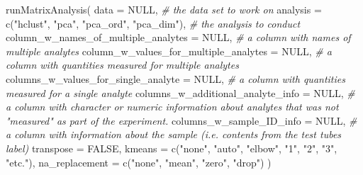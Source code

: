 \documentclass[
]{krantz}
\newenvironment{Shaded}{\begin{snugshade}}{\end{snugshade}}
\newcommand{\AttributeTok}[1]{\textcolor[rgb]{0.77,0.63,0.00}{#1}}
\newcommand{\CommentTok}[1]{\textcolor[rgb]{0.56,0.35,0.01}{\textit{#1}}}
\newcommand{\ConstantTok}[1]{\textcolor[rgb]{0.00,0.00,0.00}{#1}}
\newcommand{\FunctionTok}[1]{\textcolor[rgb]{0.00,0.00,0.00}{#1}}
\newcommand{\NormalTok}[1]{#1}
\newcommand{\StringTok}[1]{\textcolor[rgb]{0.31,0.60,0.02}{#1}}
\begin{document}
\begin{Shaded}
\begin{Highlighting}[]

\FunctionTok{runMatrixAnalysis}\NormalTok{(}
  \AttributeTok{data =} \ConstantTok{NULL}\NormalTok{, }\CommentTok{\# the data set to work on}
  \AttributeTok{analysis =} \FunctionTok{c}\NormalTok{(}\StringTok{"hclust"}\NormalTok{, }\StringTok{"pca"}\NormalTok{, }\StringTok{"pca\_ord"}\NormalTok{, }\StringTok{"pca\_dim"}\NormalTok{), }\CommentTok{\# the analysis to conduct}
  \AttributeTok{column\_w\_names\_of\_multiple\_analytes =} \ConstantTok{NULL}\NormalTok{, }\CommentTok{\# a column with names of multiple analytes}
  \AttributeTok{column\_w\_values\_for\_multiple\_analytes =} \ConstantTok{NULL}\NormalTok{, }\CommentTok{\# a column with quantities measured for multiple analytes}
  \AttributeTok{columns\_w\_values\_for\_single\_analyte =} \ConstantTok{NULL}\NormalTok{, }\CommentTok{\# a column with quantities measured for a single analyte}
  \AttributeTok{columns\_w\_additional\_analyte\_info =} \ConstantTok{NULL}\NormalTok{, }\CommentTok{\# a column with character or numeric information about analytes that was not "measured" as part of the experiment.}
  \AttributeTok{columns\_w\_sample\_ID\_info =} \ConstantTok{NULL}\NormalTok{, }\CommentTok{\# a column with information about the sample (i.e. contents from the test tube\textquotesingle{}s label)}
  \AttributeTok{transpose =} \ConstantTok{FALSE}\NormalTok{,}
  \AttributeTok{kmeans =} \FunctionTok{c}\NormalTok{(}\StringTok{"none"}\NormalTok{, }\StringTok{"auto"}\NormalTok{, }\StringTok{"elbow"}\NormalTok{, }\StringTok{"1"}\NormalTok{, }\StringTok{"2"}\NormalTok{, }\StringTok{"3"}\NormalTok{, }\StringTok{"etc."}\NormalTok{),}
  \AttributeTok{na\_replacement =} \FunctionTok{c}\NormalTok{(}\StringTok{"none"}\NormalTok{, }\StringTok{"mean"}\NormalTok{, }\StringTok{"zero"}\NormalTok{, }\StringTok{"drop"}\NormalTok{)}
\NormalTok{)}
\end{Highlighting}
\end{Shaded}


  
\end{document}
